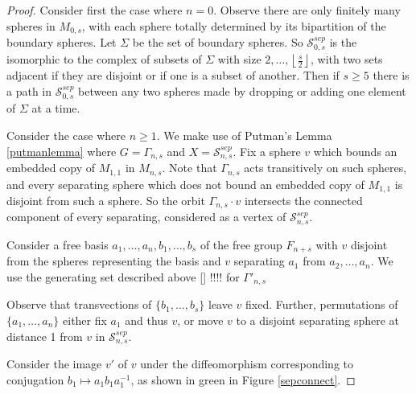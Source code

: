 \documentclass[11pt]{article}
\theoremstyle{remark}
\theoremstyle{definition}
\begin{document}
\begin{proof}
Consider first the case where $n=0$.
Observe there are only finitely many spheres in $M_{0,s}$,
with each sphere totally determined by
its
bipartition of the boundary spheres.
Let $\Sigma$ be the set of boundary spheres.
So $\mathcal {S}^{sep}_{0,s}$ is the
isomorphic to the complex of
subsets of $\Sigma$ with size
$2, \ldots, \left \lfloor \frac s 2 \right \rfloor$,
with two sets adjacent if they are disjoint
or if one is a subset of another.
Then
if
$s \geq 5$ there is a path
in $\mathcal {S}^{sep}_{0,s}$ between any two spheres
made by dropping or adding one element of $\Sigma$ at a time.


Consider the case where $n \geq 1$.
We make use of Putman's Lemma \ref{putmanlemma}
where $G = \Gamma_{n,s}$ and $X=\mathcal {S}^{sep}_{n,s}$.
Fix a sphere $v$ which bounds an embedded copy of $M_{1,1}$ in $M_{n,s}$.
Note that $\Gamma_{n,s}$ acts transitively on
such spheres, and every separating sphere which does not
bound an embedded copy of $M_{1,1}$
is disjoint from such a sphere.
So the orbit $\Gamma_{n,s} \cdot v$ intersects
the connected component of every separating, considered as a vertex of
$\mathcal {S}^{sep}_{n,s}$.

Consider a free basis $a_1, \ldots, a_n, b_1, \ldots, b_s$
of the free group $F_{n+s}$
with $v$ disjoint from the spheres representing the basis
and $v$ separating $a_1$ from $a_2, \ldots, a_n$.
We use the generating set described above \ref{} !!!! for $\Gamma'_{n,s}$

Observe that transvections of $\{b_1, \ldots, b_s\}$
leave $v$ fixed.
Further, permutations of $\{a_1, \ldots, a_n\}$
either fix $a_1$ and thus $v$, or move $v$ to a disjoint separating sphere
at distance 1 from $v$ in $\mathcal {S}^{sep}_{n,s}$.

Consider the image $v'$ of $v$ under the
diffeomorphism corresponding to
conjugation $b_1 \mapsto a_1b_1a_1^{-1}$,
as shown in green in Figure \ref{sepconnect}.


\end{proof}
\end{document}

